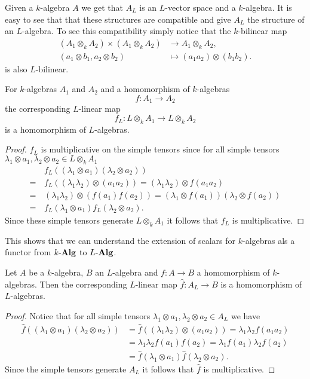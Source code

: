 Given a $k$-algebra $A$ we get that $A_L$ is an $L$-vector space and a $k$-algebra. It is easy to see that that these structures are compatible and give $A_L$ the structure of an $L$-algebra. To see this compatibility simply notice that the $k$-bilinear map
\begin{align*}
 (A_1 \otimes_k A_2) \times (A_1 \otimes_k A_2) &\to A_1 \otimes_k A_2, \\
 (a_1 \otimes b_1, a_2 \otimes b_2) &\mapsto (a_1 a_2) \otimes (b_1 b_2).
\end{align*}
is also $L$-bilinear.

\begin{lem}
 For $k$-algebras $A_1$ and $A_2$ and a homomorphism of $k$-algebras
 \[
  f \colon A_1 \to A_2
 \]
 the corresponding $L$-linear map
 \[
  f_L \colon L \otimes_k A_1 \to L \otimes_k A_2
 \]
 is a homomorphism of $L$-algebras.
\end{lem}
\begin{proof}
 $f_L$ is multiplicative on the simple tensors since for all simple tensors $\lambda_1 \otimes a_1, \lambda_2 \otimes a_2 \in L \otimes_k A_1$
 \begin{align*}
   &\, f_L((\lambda_1 \otimes a_1)(\lambda_2 \otimes a_2)) \\
  =&\, f_L((\lambda_1 \lambda_2) \otimes (a_1 a_2))
  =    (\lambda_1 \lambda_2) \otimes f(a_1 a_2) \\
  =&\, (\lambda_1 \lambda_2) \otimes (f(a_1)f(a_2))
  =    (\lambda_1 \otimes f(a_1)) (\lambda_2 \otimes f(a_2)) \\
  =&\, f_L(\lambda_1 \otimes a_1) f_L(\lambda_2 \otimes a_2).
 \end{align*}
 Since these simple tensors generate $L \otimes_k A_1$ it follows that $f_L$ is multiplicative.
\end{proof}
 
This shows that we can understand the extension of scalars for $k$-algebras als a functor from $k\text{-}\mathbf{Alg}$ to $L\text{-}\mathbf{Alg}$.

\begin{lem}
 Let $A$ be a $k$-algebra, $B$ an $L$-algebra and $f \colon A \to B$ a homomorphism of $k$-algebras. Then the corresponding $L$-linear map $\hat{f} \colon A_L \to B$ is a homomorphism of $L$-algebras.
 \begin{proof}
 Notice that for all simple tensors $\lambda_1 \otimes a_1, \lambda_2 \otimes a_2 \in A_L$ we have
  \begin{align*}
   \hat{f}((\lambda_1 \otimes a_1)(\lambda_2 \otimes a_2))
   &= \hat{f}((\lambda_1 \lambda_2) \otimes (a_1 a_2))
   = \lambda_1 \lambda_2 f(a_1 a_2) \\
   &= \lambda_1 \lambda_2 f(a_1) f(a_2)
   = \lambda_1 f(a_1) \lambda_2 f(a_2) \\
   &= \hat{f}(\lambda_1 \otimes a_1) \hat{f}(\lambda_2 \otimes a_2).
  \end{align*}
  Since the simple tensors generate $A_L$ it follows that $\hat{f}$ is multiplicative.
 \end{proof}
\end{lem}


